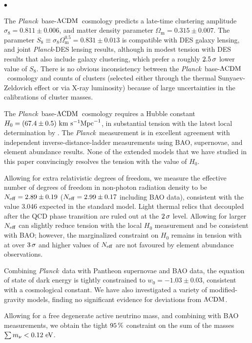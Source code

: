\documentclass[longauth,traditabstract]{aa}
\def\Planck{\textit{Planck}}
\def\,{\thinspace}
\newenvironment{unindentedlist}{
 \begin{list}{{$\bullet$}}{
  \setlength\partopsep{0pt}
  \setlength\parskip{0pt}
  \setlength\parsep{0pt}
  \setlength\topsep{0pt}
  \setlength\itemsep{0pt}
  \setlength{\itemindent}{\leftmargin}
  \setlength{\leftmargin}{0pt}
 }
}{
 \end{list}
}
\newcommand{\wzero}{w_0}
\newcommand{\lcdm}{\texorpdfstring{{$\rm{\Lambda CDM}$}}{ΛCDM}}
\newcommand{\nnu}{N_{\rm eff}}
\newcommand{\mnu}{\sum m_\nu}
\providecommand{\text}[1]{\rm{#1}}
\newcommand{\Mpc}{\text{Mpc}}
\newcommand{\Hunit}{~\text{km}~\text{s}^{-1} \Mpc^{-1}}
\newcommand{\eV}{\,\text{eV}}
\providecommand{\Omm}{\Omega_{\mathrm{m}}}
\newcommand{\planck}{\Planck}
\begin{document}
\begin{unindentedlist}
\item The \planck\ base-\lcdm\ cosmology predicts a late-time clustering amplitude
$\sigma_8 = 0.811\pm 0.006$, and matter density parameter $\Omm =
0.315\pm 0.007$.  The parameter $S_8\equiv \sigma_8 \Omm^{0.5} =
0.831\pm 0.013$ is compatible with DES galaxy lensing, and
joint \planck-DES lensing results, although in modest tension with DES
results that also include galaxy clustering, which prefer a roughly $2.5\,\sigma$ lower
value of $S_8$. There is no obvious inconsistency
between the \planck\ base-\lcdm\ cosmology and counts of clusters (selected either
through the thermal Sunyaev-Zeldovich effect or via X-ray luminosity) because
of large uncertainties in the calibrations of cluster masses.


\item The \planck\ base-\lcdm\ cosmology requires a Hubble constant
$H_0 = (67.4\pm 0.5)\Hunit$, in substantial \rep{$4.4\,\sigma$} tension with the latest local determination by \citet{Riess:2019cxk}. The \planck\ measurement is in excellent agreement with independent inverse-distance-ladder measurements using BAO, supernovae, and element abundance results. None of the extended models that we have studied in this paper convincingly resolves the tension
with the \citet{Riess:2019cxk} value of $H_0$.


\item Allowing for extra relativistic degrees of freedom,
we measure the effective number of degrees of freedom in non-photon radiation density to be $\nnu = 2.89\pm 0.19$ ($\nnu=2.99\pm 0.17$ including BAO data), consistent with the value 3.046 expected in the standard model.
Light thermal relics that decoupled after the QCD phase transition are ruled out at the $2\,\sigma$ level. Allowing for larger $\nnu$ can slightly reduce tension with the local $H_0$ measurement and be consistent with BAO; however, the marginalized constraint on $H_0$ remains in tension with \citet{Riess:2019cxk} at over $3\,\sigma$ and higher values of $\nnu$ are not favoured by element abundance observations.

\item Combining \planck\ data with Pantheon supernovae and BAO data, the equation of state
of dark energy is tightly constrained to $\wzero = -1.03\pm 0.03$, consistent with a cosmological constant. We have also investigated a variety of modified-gravity models, finding no significant evidence for deviations from \lcdm.

\item Allowing for a free degenerate active neutrino mass, and combining with BAO measurements, we obtain the tight $95\,\%$ constraint on the sum of the masses $\mnu < 0.12\,\eV$.


\end{unindentedlist}
\end{document}
